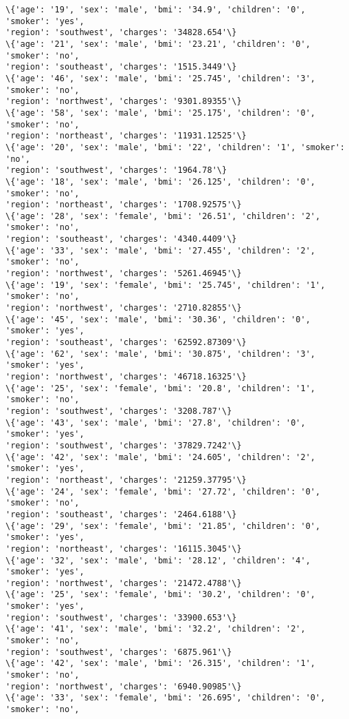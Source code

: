\documentclass[11pt]{article}
\begin{document}
\begin{Verbatim}[commandchars=\\\{\}]
\{'age': '19', 'sex': 'male', 'bmi': '34.9', 'children': '0', 'smoker': 'yes',
'region': 'southwest', 'charges': '34828.654'\}
\{'age': '21', 'sex': 'male', 'bmi': '23.21', 'children': '0', 'smoker': 'no',
'region': 'southeast', 'charges': '1515.3449'\}
\{'age': '46', 'sex': 'male', 'bmi': '25.745', 'children': '3', 'smoker': 'no',
'region': 'northwest', 'charges': '9301.89355'\}
\{'age': '58', 'sex': 'male', 'bmi': '25.175', 'children': '0', 'smoker': 'no',
'region': 'northeast', 'charges': '11931.12525'\}
\{'age': '20', 'sex': 'male', 'bmi': '22', 'children': '1', 'smoker': 'no',
'region': 'southwest', 'charges': '1964.78'\}
\{'age': '18', 'sex': 'male', 'bmi': '26.125', 'children': '0', 'smoker': 'no',
'region': 'northeast', 'charges': '1708.92575'\}
\{'age': '28', 'sex': 'female', 'bmi': '26.51', 'children': '2', 'smoker': 'no',
'region': 'southeast', 'charges': '4340.4409'\}
\{'age': '33', 'sex': 'male', 'bmi': '27.455', 'children': '2', 'smoker': 'no',
'region': 'northwest', 'charges': '5261.46945'\}
\{'age': '19', 'sex': 'female', 'bmi': '25.745', 'children': '1', 'smoker': 'no',
'region': 'northwest', 'charges': '2710.82855'\}
\{'age': '45', 'sex': 'male', 'bmi': '30.36', 'children': '0', 'smoker': 'yes',
'region': 'southeast', 'charges': '62592.87309'\}
\{'age': '62', 'sex': 'male', 'bmi': '30.875', 'children': '3', 'smoker': 'yes',
'region': 'northwest', 'charges': '46718.16325'\}
\{'age': '25', 'sex': 'female', 'bmi': '20.8', 'children': '1', 'smoker': 'no',
'region': 'southwest', 'charges': '3208.787'\}
\{'age': '43', 'sex': 'male', 'bmi': '27.8', 'children': '0', 'smoker': 'yes',
'region': 'southwest', 'charges': '37829.7242'\}
\{'age': '42', 'sex': 'male', 'bmi': '24.605', 'children': '2', 'smoker': 'yes',
'region': 'northeast', 'charges': '21259.37795'\}
\{'age': '24', 'sex': 'female', 'bmi': '27.72', 'children': '0', 'smoker': 'no',
'region': 'southeast', 'charges': '2464.6188'\}
\{'age': '29', 'sex': 'female', 'bmi': '21.85', 'children': '0', 'smoker': 'yes',
'region': 'northeast', 'charges': '16115.3045'\}
\{'age': '32', 'sex': 'male', 'bmi': '28.12', 'children': '4', 'smoker': 'yes',
'region': 'northwest', 'charges': '21472.4788'\}
\{'age': '25', 'sex': 'female', 'bmi': '30.2', 'children': '0', 'smoker': 'yes',
'region': 'southwest', 'charges': '33900.653'\}
\{'age': '41', 'sex': 'male', 'bmi': '32.2', 'children': '2', 'smoker': 'no',
'region': 'southwest', 'charges': '6875.961'\}
\{'age': '42', 'sex': 'male', 'bmi': '26.315', 'children': '1', 'smoker': 'no',
'region': 'northwest', 'charges': '6940.90985'\}
\{'age': '33', 'sex': 'female', 'bmi': '26.695', 'children': '0', 'smoker': 'no',

\end{Verbatim}
\end{document}
